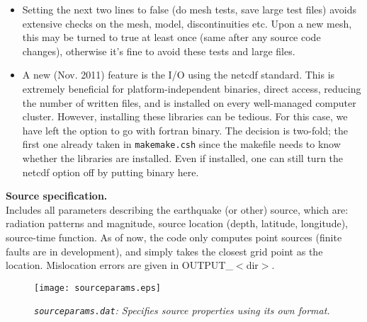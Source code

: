 \documentclass[11pt,letter,fleqn,english,notitlepage]{article}
\begin{document}
\begin{itemize}
    \item Setting the next two lines to false (do mesh tests, save large test
    files) avoids extensive checks on the mesh, model, discontinuities etc.
    Upon a new mesh, this may be turned to true at least once (same after any
    source code changes), otherwise it's fine to avoid these tests and large
    files.
    
    \item A new (Nov. 2011) feature is the I/O using the netcdf standard. This
    is extremely beneficial for platform-independent binaries, direct access,
    reducing the number of written files, and is installed on every
    well-managed computer cluster. However, installing these libraries can be
    tedious. For this case, we have left the option to go with fortran binary.
    The decision is two-fold; the first one already taken in {\tt makemake.csh}
    since the makefile needs to know whether the libraries are installed. Even
    if installed, one can still turn the netcdf option off by putting binary
    here. 
\end{itemize}

\noindent \textbf{Source specification.}\\
Includes all parameters describing the earthquake (or other) source, which are:
radiation patterns and magnitude, source location (depth, latitude, longitude),
source-time function.  As of now, the code only computes point sources (finite
faults are in development), and simply takes the closest grid point as the
location. Mislocation errors are given in OUTPUT\_$<$dir$>$.\\

\begin{figure*}[htb]
    \begin{center}
        \texttt{[image: sourceparams.eps]}
        \caption{\textit{{\tt sourceparams.dat}: Specifies source properties using its own format.}}
    \end{center}
\end{figure*}
\end{document}
